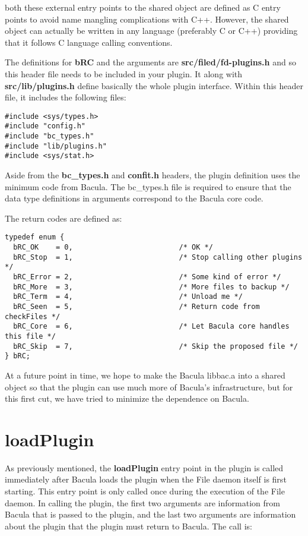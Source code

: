 both these external entry points to the shared object are defined as C entry
points to avoid name mangling complications with C++.  However, the shared
object can actually be written in any language (preferably C or C++) providing
that it follows C language calling conventions.

The definitions for {\bf bRC} and the arguments are {\bf
src/filed/fd-plugins.h} and so this header file needs to be included in
your plugin.  It along with {\bf src/lib/plugins.h} define basically the whole
plugin interface.  Within this header file, it includes the following
files:

\begin{verbatim}
#include <sys/types.h>
#include "config.h"
#include "bc_types.h"
#include "lib/plugins.h"
#include <sys/stat.h>
\end{verbatim}

Aside from the {\bf bc\_types.h} and {\bf confit.h} headers, the plugin
definition uses the minimum code from Bacula.  The bc\_types.h file is required
to ensure that the data type definitions in arguments correspond to the Bacula
core code.

The return codes are defined as:
\begin{verbatim}
typedef enum {
  bRC_OK    = 0,                         /* OK */
  bRC_Stop  = 1,                         /* Stop calling other plugins */
  bRC_Error = 2,                         /* Some kind of error */
  bRC_More  = 3,                         /* More files to backup */
  bRC_Term  = 4,                         /* Unload me */
  bRC_Seen  = 5,                         /* Return code from checkFiles */
  bRC_Core  = 6,                         /* Let Bacula core handles this file */
  bRC_Skip  = 7,                         /* Skip the proposed file */
} bRC;
\end{verbatim}


At a future point in time, we hope to make the Bacula libbac.a into a
shared object so that the plugin can use much more of Bacula's
infrastructure, but for this first cut, we have tried to minimize the
dependence on Bacula.

\section{loadPlugin}
As previously mentioned, the {\bf loadPlugin} entry point in the plugin
is called immediately after Bacula loads the plugin when the File daemon
itself is first starting.  This entry point is only called once during the
execution of the File daemon.  In calling the
plugin, the first two arguments are information from Bacula that
is passed to the plugin, and the last two arguments are information
about the plugin that the plugin must return to Bacula.  The call is:


